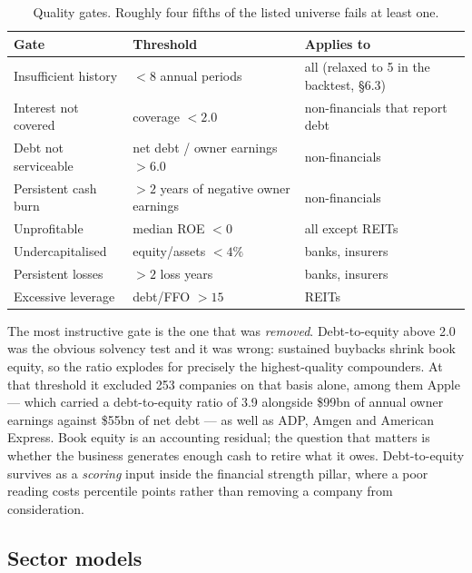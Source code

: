 \documentclass[11pt,a4paper]{article}
\begin{document}
\begin{table}[h]
\centering
\sffamily\small
\begin{tabular}{@{}llp{6.6cm}@{}}
\toprule
\textbf{Gate} & \textbf{Threshold} & \textbf{Applies to}\\
\midrule
Insufficient history & $<8$ annual periods & all (relaxed to 5 in the backtest, \S6.3)\\
Interest not covered & coverage $<2.0$ & non-financials that report debt\\
Debt not serviceable & net debt / owner earnings $>6.0$ & non-financials\\
Persistent cash burn & $>2$ years of negative owner earnings & non-financials\\
Unprofitable & median ROE $<0$ & all except REITs\\
Undercapitalised & equity/assets $<4\%$ & banks, insurers\\
Persistent losses & $>2$ loss years & banks, insurers\\
Excessive leverage & debt/FFO $>15$ & REITs\\
\bottomrule
\end{tabular}
\caption{Quality gates. Roughly four fifths of the listed universe fails at
least one.}
\end{table}

The most instructive gate is the one that was \emph{removed}. Debt-to-equity
above 2.0 was the obvious solvency test and it was wrong: sustained buybacks
shrink book equity, so the ratio explodes for precisely the highest-quality
compounders. At that threshold it excluded 253 companies on that basis alone,
among them Apple --- which carried a debt-to-equity ratio of 3.9 alongside
\$99bn of annual owner earnings against \$55bn of net debt --- as well as ADP,
Amgen and American Express. Book equity is an accounting residual; the question
that matters is whether the business generates enough cash to retire what it
owes. Debt-to-equity survives as a \emph{scoring} input inside the financial
strength pillar, where a poor reading costs percentile points rather than
removing a company from consideration.

\subsection{Sector models}
\end{document}
